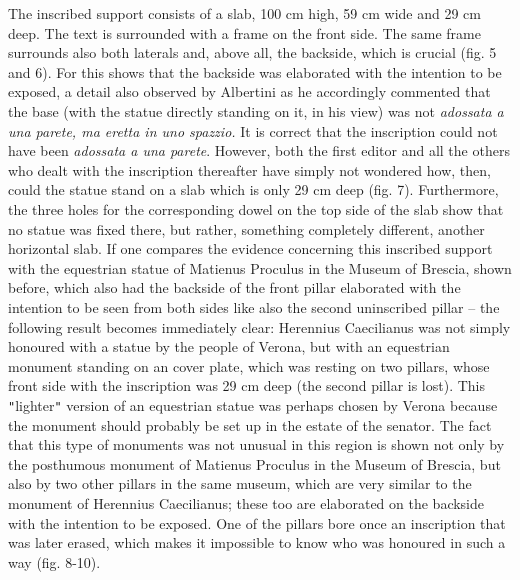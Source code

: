 \documentclass{article}
\begin{document}
The inscribed support consists of a slab, 100 cm high, 59 cm wide and 29 cm deep. 
The text is surrounded with a frame on the front side. The same frame surrounds 
also both laterals and, above all, the backside, which is crucial (fig. 5 and 6). 
For this shows that the backside was elaborated with the intention to be exposed, 
a detail also observed by Albertini as he accordingly commented that the base (with 
the statue directly standing on it, in his view) was not \textit{adossata a una 
parete, ma eretta in uno spazzio.} It is correct that the inscription could not 
have been \textit{adossata a una parete}. However, both the first editor and all 
the others who dealt with the inscription thereafter have simply not wondered how, 
then, could the statue stand on a slab which is only 29 cm deep (fig. 7). Furthermore, 
the three holes for the corresponding dowel on the top side of the slab show that 
no statue was fixed there, but rather, something completely different, another 
horizontal slab. If one compares the evidence concerning this inscribed support 
with the equestrian statue of Matienus Proculus in the Museum of Brescia, shown 
before, which also had the backside of the front pillar elaborated with the intention 
to be seen from both sides like also the second uninscribed pillar – the following 
result becomes immediately clear: Herennius Caecilianus was not simply honoured 
with a statue by the people of Verona, but with an equestrian monument standing 
on an cover plate, which was resting on two pillars, whose front side with the 
inscription was 29 cm deep (the second pillar is lost). This \texttt{"}lighter\texttt{"} 
version of an equestrian statue was perhaps chosen by Verona because the monument 
should probably be set up in the estate of the senator. The fact that this type 
of monuments was not unusual in this region is shown not only by the posthumous 
monument of Matienus Proculus in the Museum of Brescia, but also by two other pillars 
in the same museum, which are very similar to the monument of Herennius Caecilianus; 
these too are elaborated on the backside with the intention to be exposed. One 
of the pillars bore once an inscription that was later erased, which makes it impossible 
to know who was honoured in such a way (fig. 8-10).  
\end{document}
